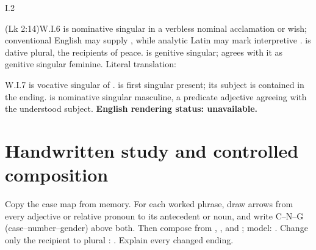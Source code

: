 \begin{courseunit}{I.2}
\begin{workedexample}{ (Lk 2:14)}{W.I.6}
 is nominative singular in a verbless nominal acclamation or wish;
conventional English may supply , while analytic Latin may mark
interpretive \Latin{[sit]}.  is dative plural, the recipients of peace.
 is genitive singular;  agrees with it as
genitive singular feminine. Literal translation: 
\end{workedexample}

\begin{workedexample}{}{W.I.7}
 is vocative singular of .  is first
singular present; its subject  is contained in the ending.
 is nominative singular masculine, a predicate adjective agreeing
with the understood subject. \textbf{English rendering status: unavailable.}
\end{workedexample}

\section{Handwritten study and controlled composition}

Copy the case map from memory. For each worked phrase, draw arrows from every
adjective or relative pronoun to its antecedent or noun, and write C--N--G
(case--number--gender) above both. Then compose 
from , , and ; model:
. Change only the recipient to plural
: . Explain every changed
ending.




\end{courseunit}

